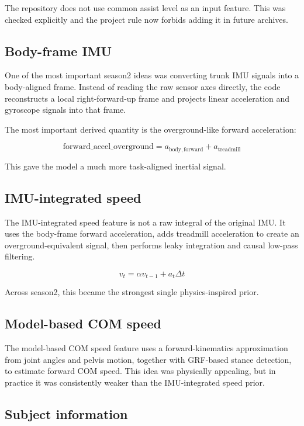 \documentclass[11pt,a4paper]{article}
\begin{document}
The repository does not use common assist level as an input feature. This was checked explicitly and the project rule now forbids adding it in future archives.

\subsection{Body-frame IMU}

One of the most important season2 ideas was converting trunk IMU signals into a body-aligned frame. Instead of reading the raw sensor axes directly, the code reconstructs a local right-forward-up frame and projects linear acceleration and gyroscope signals into that frame.

The most important derived quantity is the overground-like forward acceleration:

\[
\mathrm{forward\_accel\_overground} = a_{\mathrm{body,forward}} + a_{\mathrm{treadmill}}
\]

This gave the model a much more task-aligned inertial signal.

\subsection{IMU-integrated speed}

The IMU-integrated speed feature is not a raw integral of the original IMU. It uses the body-frame forward acceleration, adds treadmill acceleration to create an overground-equivalent signal, then performs leaky integration and causal low-pass filtering.

\[
v_t = \alpha v_{t-1} + a_t \Delta t
\]

Across season2, this became the strongest single physics-inspired prior.

\subsection{Model-based COM speed}

The model-based COM speed feature uses a forward-kinematics approximation from joint angles and pelvis motion, together with GRF-based stance detection, to estimate forward COM speed. This idea was physically appealing, but in practice it was consistently weaker than the IMU-integrated speed prior.

\subsection{Subject information}
\end{document}
